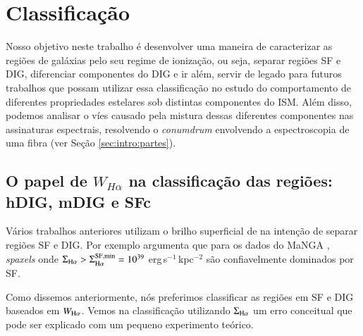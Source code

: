 


\chapter{Classificação}
\label{sec:DIGclass}
Nosso objetivo neste trabalho é desenvolver uma maneira de caracterizar as regiões de galáxias pelo seu regime de ionização, ou seja, separar regiões SF e DIG, diferenciar componentes do DIG e ir além, servir de legado para futuros trabalhos que possam utilizar essa classificação no estudo do comportamento de diferentes propriedades estelares sob distintas componentes do ISM. Além disso, podemos analisar o víes causado pela mistura dessas diferentes componentes nas assinaturas espectrais, resolvendo o {\em conumdrum} envolvendo a espectroscopia de uma fibra (ver Seção \ref{sec:intro:partes}).

\section{O papel de $W_{H\alpha}$ na classificação das regiões: hDIG, mDIG e SFc}
\label{sec:DIGclass:WHa}

Vários trabalhos anteriores utilizam o brilho superficial de \Ha na intenção de separar regiões SF e DIG. Por exemplo \citet{Zhang.etal.2017a} argumenta que para os dados do MaNGA \citep{Bundy.etal.2015}, {\em spaxels} onde $\Sigma_{\Ha} > \Sigma_{\Ha}^{\rm SF,min} = 10^{39}$ erg$\,$s$^{-1}\,$kpc$^{-2}$ são confiavelmente dominados por SF.

Como dissemos anteriormente, nós preferimos classificar as regiões em SF e DIG baseados em $W_{\Ha}$. Vemos na classificação utilizando $\Sigma_{\Ha}$ um erro conceitual que pode ser explicado com um pequeno experimento teórico.

